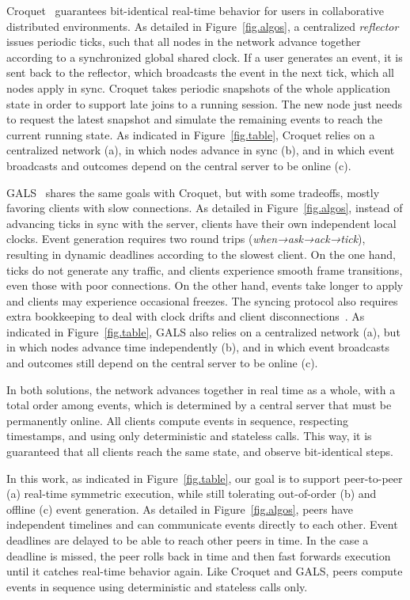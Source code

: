 \documentclass[10pt,journal,compsoc]{IEEEtran}
\begin{document}
Croquet~\cite{croquet,croquet.site} guarantees bit-identical real-time behavior
for users in collaborative distributed environments.
%
As detailed in Figure~\ref{fig.algos}, a centralized \emph{reflector} issues
periodic ticks, such that all nodes in the network advance together according
to a synchronized global shared clock.
If a user generates an event, it is sent back to the reflector, which
broadcasts the event in the next tick, which all nodes apply in sync.
%
Croquet takes periodic snapshots of the whole application state in order to
support late joins to a running session.
The new node just needs to request the latest snapshot and simulate the
remaining events to reach the current running state.
%
As indicated in Figure~\ref{fig.table}, Croquet relies on a centralized
network (a), in which nodes advance in sync (b), and in which event broadcasts
and outcomes depend on the central server to be online (c).

GALS~\cite{gals} shares the same goals with Croquet, but with some tradeoffs,
mostly favoring clients with slow connections.
As detailed in Figure~\ref{fig.algos}, instead of advancing ticks in sync with
the server, clients have their own independent local clocks.
Event generation requires two round trips (\emph{when→ask→ack→tick}), resulting
in dynamic deadlines according to the slowest client.
%
On the one hand, ticks do not generate any traffic, and clients experience
smooth frame transitions, even those with poor connections.
On the other hand, events take longer to apply and clients may experience
occasional freezes.
The syncing protocol also requires extra bookkeeping to deal with clock drifts
and client disconnections~\cite{gals}.
%
As indicated in Figure~\ref{fig.table}, GALS also relies on a centralized
network (a), but in which nodes advance time independently (b), and in which
event broadcasts and outcomes still depend on the central server to be online
(c).

In both solutions, the network advances together in real time as a whole, with
a total order among events, which is determined by a central server that must
be permanently online.
All clients compute events in sequence, respecting timestamps, and using only
deterministic and stateless calls.
This way, it is guaranteed that all clients reach the same state, and
observe bit-identical steps.

In this work, as indicated in Figure~\ref{fig.table}, our goal is to support
peer-to-peer (a) real-time symmetric execution, while still tolerating
out-of-order (b) and offline (c) event generation.
%
As detailed in Figure~\ref{fig.algos}, peers have independent timelines and
can communicate events directly to each other.
Event deadlines are delayed to be able to reach other peers in time.
In the case a deadline is missed, the peer rolls back in time and then fast
forwards execution until it catches real-time behavior again.
%
Like Croquet and GALS, peers compute events in sequence using deterministic and
stateless calls only.
\end{document}
